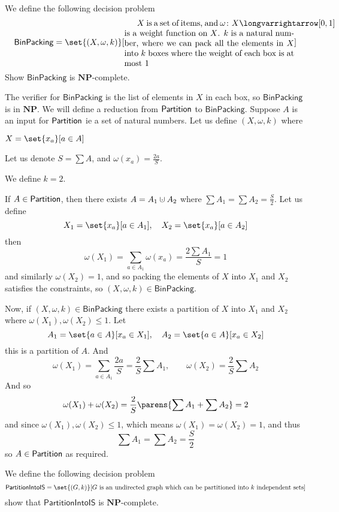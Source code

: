 \documentclass[10pt]{article}
\let\longto=\longvarrightarrow
\def\NP{\mathbf{NP}}
\begin{document}
\def\binpack{\mathsf{BinPacking}}
\begin{exercise*}

    We define the following decision problem
    \[ \binpack = \set{(X,\omega,k)}[\vcenter{\advance\hsize by-5cm
    $X$ is a set of items, and $\omega\colon X\longto[0,1]$ is a weight function on $X$.
    $k$ is a natural number, where we can pack all the elements in $X$ into $k$ boxes where the weight of each box is at most $1$}] \]
    Show $\binpack$ is $\NP$-complete.

\end{exercise*}

The verifier for $\binpack$ is the list of elements in $X$ in each box, so $\binpack$ is in $\NP$.
We will define a reduction from $\mathsf{Partition}$ to $\binpack$.
Suppose $A$ is an input for $\mathsf{Partition}$ ie a set of natural numbers.
Let us define $(X,\omega,k)$ where
\benum
    \item $X=\set{x_a}[a\in A]$
    \item Let us denote $S=\sum A$, and $\omega(x_a)=\frac{2a}{S}$.
    \item We define $k=2$.
\eenum

If $A\in\mathsf{Partition}$, then there exists $A=A_1\dcup A_2$ where $\sum A_1=\sum A_2=\frac S2$.
Let us define
\[ X_1 = \set{x_a}[a\in A_1],\quad X_2 = \set{x_a}[a\in A_2] \]
then
\[ \omega(X_1) = \sum_{a\in A_1}\omega(x_a) = \frac{2\sum A_1}{S} = 1 \]
and similarly $\omega(X_2)=1$, and so packing the elements of $X$ into $X_1$ and $X_2$ satisfies the constraints, so $(X,\omega,k)\in\binpack$.

Now, if $(X,\omega,k)\in\binpack$ there exists a partition of $X$ into $X_1$ and $X_2$ where $\omega(X_1),\omega(X_2)\leq1$.
Let
\[ A_1 = \set{a\in A}[x_a\in X_1],\quad A_2 = \set{a\in A}[x_a\in X_2] \]
this is a partition of $A$.
And
\[ \omega(X_1) = \sum_{a\in A_1}\frac{2a}S = \frac2S\sum A_1,\qquad \omega(X_2) = \frac2S\sum A_2 \]
And so
\[ \omega(X_1) + \omega(X_2) = \frac2S\parens{\sum A_1+\sum A_2} = 2 \]
and since $\omega(X_1),\omega(X_2)\leq1$, which means $\omega(X_1)=\omega(X_2)=1$, and thus
\[ \sum A_1 = \sum A_2 = \frac S2 \]
so $A\in\mathsf{Partition}$ as required.

\def\partintois{\mathsf{PartitionIntoIS}}
\begin{exercise*}

    We define the following decision problem
    \[ \partintois = \set{(G,k)}[\text{$G$ is an undirected graph which can be partitioned into $k$ independent sets}] \]
    show that $\partintois$ is $\NP$-complete.

\end{exercise*}
\end{document}
